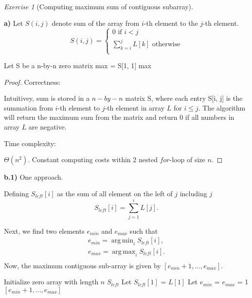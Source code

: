 \documentclass[a4paper,10pt,twoside]{article}
\DeclareMathOperator*{\argmin}{arg\,min}
\DeclareMathOperator*{\argmax}{arg\,max}
\theoremstyle{plain}
\theoremstyle{definition}
\theoremstyle{remark}
\newtheorem{exercise}{Exercise}
\begin{document}
\begin{exercise}[Computing maximum sum of contiguous subarray]\

\textbf{a)}
Let $S(i, j)$ denote sum of the array from $i$-th element to the $j$-th element.
\[
	S(i, j) = \begin{cases}
		0 \text{ if $i < j$}\\
		\sum_{k=i}^j L[k] \text{ otherwise}\\
		\end{cases}
\]
\begin{algorithm}[h]
	\caption{Naive Sum(L[1..n])}
	Let S be a n-by-n zero matrix\;
	max = S[1, 1]
	\Return max
\end{algorithm}
\begin{proof}

Correctness: 

Intuitivey, sum is stored in a $n-by-n$ matrix S, where each entry S[i, j] is the summation from $i$-th element to $j$-th element in array $L$ for $i \leq j$. The algorithm will return the maximum sum from the matrix and return 0 if all numbers in array $L$ are negative.

Time complexity:

$\Theta(n^2)$. Constant computing costs within 2 nested $for$-loop of size $n$. 

\end{proof}

\textbf{b.1)} One approach.

Defining $S_{left}[i]$
as the sum of all element on the left of $j$ including $j$
\[
	S_{left}[i] = \sum_{j=1}^i L[j].
\]

Next, we find two elements $e_{min}$ and $e_{max}$ such that
\[
\begin{aligned}
	e_{min} = \argmin_i S_{left}[i],\\
	e_{max} = \argmax_i S_{left}[i].\\
\end{aligned}
\]
Now, the maximum contiguous sub-array is given by $[e_{min}+1,...,e_{max}]$.

\begin{algorithm}[H]
\label{algo:max-contiguous-array}
\caption{Find maximum contiguous array(L)}
Initialize zero array with length $n$ $S_{left}$\;
Let $S_{left}[1]$ = $L[1]$\;
Let $e_{min}$ = $e_{max}$ = 1\;
\Return $[e_{min} +1, ..., e_{max}]$
\end{algorithm}


\end{exercise}
\end{document}
